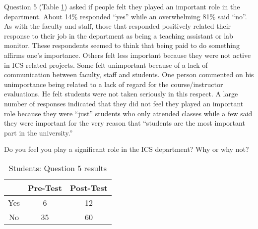 Question 5 (Table \ref{tab:question5s}) asked if people felt they played an
important role in the department.  About 14\% responded ``yes'' while an
overwhelming 81\% said ``no''.  As with the faculty and staff, those that
responded positively related their response to their job in the department as
being a teaching assistant or lab monitor.  These respondents seemed to think
that being paid to do something affirms one's importance.  Others felt less
important because they were not active in ICS related projects.  Some felt
unimportant because of a lack of communication between faculty, staff and
students.  One person commented on his unimportance being related to a lack of
regard for the course/instructor evaluations.  He felt students were not taken
seriously in this respect.  A large number of responses indicated that they did
not feel they played an important role because they were ``just'' students who
only attended classes while a few said they were important for the very reason
that ``students are the most important part in the university.''

\begin{table}[htb]
\caption{Students: Question 5 results}
{Do you feel you play a significant role in the ICS department?  Why
  or why not?} 
\begin{center}
\begin{tabular}{|c|c|c|} \hline
  & {\bf Pre-Test} & {\bf Post-Test} \\ \hline 
 Yes & 6 & 12 \\ \hline 
 No & 35 & 60 \\ \hline 
\end{tabular}
\end{center}
\label{tab:question5s}
\end{table}

